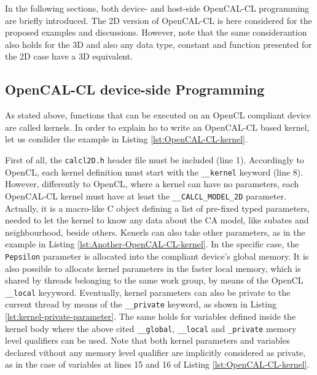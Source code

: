 In the following sections, both device- and host-side OpenCAL-CL
programming are briefly introduced. The 2D version of OpenCAL-CL is
here considered for the proposed examples and discussions. However,
note that the same considerantion also holds for the 3D and also any
data type, constant and function presented for the 2D case have a 3D
equivalent.


\subsection{OpenCAL-CL device-side Programming}

As stated above, functions that can be executed on an OpenCL compliant
device are called kernels. In order to explain ho to write an
OpenCAL-CL based kernel, let us condider the example in Listing
\ref{lst:OpenCAL-CL-kernel}.

First of all, the \verb'calcl2D.h' header file must be included (line
1). Accordingly to OpenCL, each kernel definition must start with the
\verb'__kernel' keyword (line 8). However, differently to OpenCL,
where a kernel can have no parameters, each OpenCAL-CL kernel must
have at least the \verb'__CALCL_MODEL_2D' parameter. Actually, it is a
macro-like C object defining a list of pre-fixed typed parameters,
needed to let the kernel to know any data about the CA model, like
subates and neighbourhood, beside others. Kenerls can also take other
parameters, as in the example in Listing
\ref{lst:Another-OpenCAL-CL-kernel}. In the specific case, the
\verb'Pepsilon' parameter is allocated into the compliant device's
global memory. It is also possible to allocate kernel parameters in
the faster local memory, which is shared by threads belonging to the
same work group, by means of the OpenCL \verb'__local'
keyyword. Eventually, kernel parameters can also be private to the
current thread by means of the \verb'__private' keyword, as shown in
Listing \ref{lst:kernel-private-parameter}. The same holds for
variables defined inside the kernel body where the above cited
\verb'__global', \verb'__local' and \verb'_private' memory level
qualifiers can be used. Note that both kernel parameters and variables
declared vithout any memory level qualifier are implicitly considered
as private, as in the case of variables at lines 15 and 16 of Listing
\ref{lst:OpenCAL-CL-kernel}.

